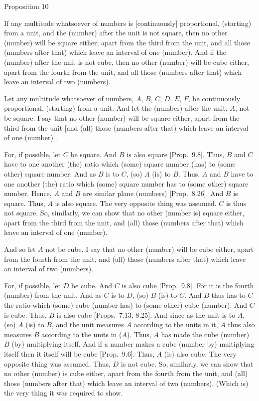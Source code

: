 
\begin{center}
{\large Proposition 10}
\end{center}

If any multitude whatsoever of numbers is [continuously] proportional, (starting) from a unit, and the (number) after the
unit is not  square, then no other (number) will be  square
either, apart from the third from the unit, and all those (numbers after that) which leave an interval of  one (number). And if the (number) after the unit is not cube, then no other (number) will be cube
 either, apart from the fourth from the unit, and all those (numbers after that) which leave an interval of  two (numbers).
 
\epsfysize=1.8in
\centerline{}
 
Let any multitude whatsoever of numbers, $A$, $B$, $C$, $D$, $E$, $F$, be continuously proportional, (starting) from a unit. And let the (number) after the unit, $A$, not be  square. I say that  no other (number)  will
be square either, apart from the third from the unit [and (all) those (numbers after that) which leave an interval of  one (number)].

For, if possible, let $C$ be square.  And $B$ is also square [Prop.~9.8]. Thus, $B$ and $C$ have to one another (the) ratio which (some) square number (has) to (some other) square number. And as $B$ is to $C$, (so) $A$ (is) to $B$. Thus, $A$ and $B$ have
to one another (the) ratio which (some) square number has to (some other)
square number.  Hence, $A$ and $B$ are similar plane (numbers) [Prop.~8.26]. And $B$ is square.
Thus, $A$ is also  square. The very opposite thing was assumed.
$C$ is thus not square. So, similarly, we can show that no other
(number is) square either, apart from the  third from the unit, and (all) those (numbers after that) which leave an interval of  one (number).

And so let $A$ not be  cube. I say that  no other (number)  will
be cube either, apart from the fourth from the unit, and (all) those (numbers after that) which leave an interval of  two (numbers).

For, if possible, let $D$ be  cube. And $C$ is also  cube 
[Prop.~9.8]. For it is the fourth (number) from the unit.
And as $C$ is to $D$,  (so) $B$ (is) to $C$. And $B$ thus has to $C$ the
ratio which (some) cube (number has) to (some other) cube (number). And $C$
is  cube. Thus, $B$ is also cube [Props.~7.13, 8.25].
And since as the unit is to $A$,  (so) $A$ (is) to $B$, and the unit measures
$A$ according to the units in it, $A$ thus also measures $B$ according to the units in ($A$). Thus, $A$ has made the cube  (number) $B$ (by) multiplying
itself. And if a number makes a cube (number by) multiplying itself then
it itself will be  cube  [Prop.~9.6]. Thus, $A$
(is) also  cube. The very opposite thing was assumed. Thus, $D$ is not
cube. So, similarly, we can show that no other (number) is cube
either, apart from the fourth from the unit, and (all) those (numbers after that) which leave an interval of  two (numbers). (Which is) the very thing it was required to show.

